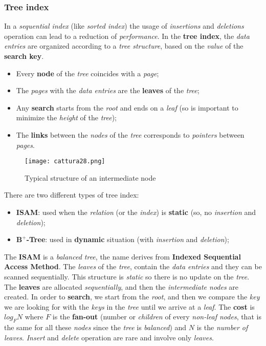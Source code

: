 \documentclass{article}
\begin{document}
\subsubsection {Tree index}
In a \emph{sequential index} (like \emph{sorted index}) the usage of \emph{insertions} and \emph{deletions} operation can lead to a reduction of \emph{performance}. In the \textbf{tree index}, the \emph{data entries} are organized according to a \emph{tree structure}, based on the \emph{value} of the \textbf{search key}.
\begin{itemize}
\item Every \textbf{node} of the \emph{tree} coincides with a \emph{page};
\item The \emph{pages} with the \emph{data entries} are the \textbf{leaves} of the \emph{tree};
\item Any \textbf{search} starts from the \emph{root} and ends on a \emph{leaf} (so is important to minimize the \emph{height} of the \emph{tree});
\item The \textbf{links} between the \emph{nodes} of the \emph{tree} corresponds to \emph{pointers} between \emph{pages}. 
\end{itemize}
\begin{figure}[H]
  \centering
  \texttt{[image: cattura28.png]}
  \caption{Typical structure of an intermediate node}
\end{figure} 
There are two different types of tree index:
\begin{itemize}
\item \textbf{ISAM}: used when the \emph{relation} (or the \emph{index}) is \textbf{static} (so, no \emph{insertion} and \emph{deletion});
\item \textbf{$\mathbf{B^+}$-Tree}: used in \textbf{dynamic} situation (with \emph{insertion} and \emph{deletion});
\end{itemize}
The \textbf{ISAM} is a \emph{balanced tree}, the name derives from \textbf{Indexed Sequential Access Method}. The \emph{leaves} of the \emph{tree}, contain the \emph{data entries} and they can be scanned sequentially. This structure is \emph{static} so there is no update on the \emph{tree}. The \textbf{leaves} are allocated \emph{sequentially}, and then the \emph{intermediate nodes} are created. In order to \textbf{search}, we start from the \emph{root}, and then we compare the \emph{key} we are looking for with the \emph{keys} in the \emph{tree} until we arrive at a \emph{leaf}. The \textbf{cost} is $log_FN$ where $F$ is the\textbf{ fan-out} (number or \emph{children} of every \emph{non-leaf nodes}, that is the same for all these \emph{nodes} since the \emph{tree} is \emph{balanced}) and $N$ is the \emph{number of leaves}. \emph{Insert} and \emph{delete} operation are rare and involve only \emph{leaves}. \\\\
\end{document}
